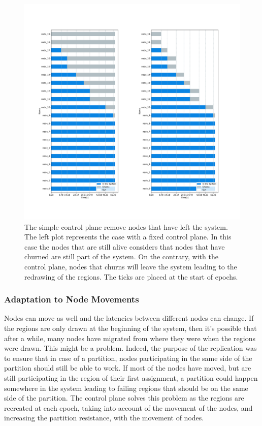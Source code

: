 \documentclass[a4paper,11pt,twoside,openright]{report}
\begin{document}
\begin{figure}[!h] 
\centering
\includegraphics[width=450pt]{figures/ChurnSubplots}
\caption{The simple control plane remove nodes that have left the system. The left plot represents the case with a fixed control plane. In this case the nodes that are still alive considers that nodes that have churned are still part of the system. On the contrary, with the control plane, nodes that churns will leave the system leading to the redrawing of the regions. The ticks are placed at the start of epochs.}
 \label{fig:churn-comparision}
\end{figure}

\subsubsection{Adaptation to Node Movements}
Nodes can move as well and the latencies between different nodes can change. If the regions are only drawn at the beginning of the
system, then it's possible that after a while, many nodes have migrated from
where they were when the regions were drawn. This might be a
problem. Indeed, the purpose of the replication was to ensure that in case of a
partition, nodes participating in the same side of the partition should still
be able to work. If most of the nodes have moved, but are still participating
in the region of their first assignment, a partition could happen somewhere in
the system leading to failing regions that should be on the same side of the
partition. The control plane solves this problem as the regions are recreated at
each epoch, taking into account of the movement of the nodes, and increasing the
partition resistance, with the movement of nodes.
\end{document}

